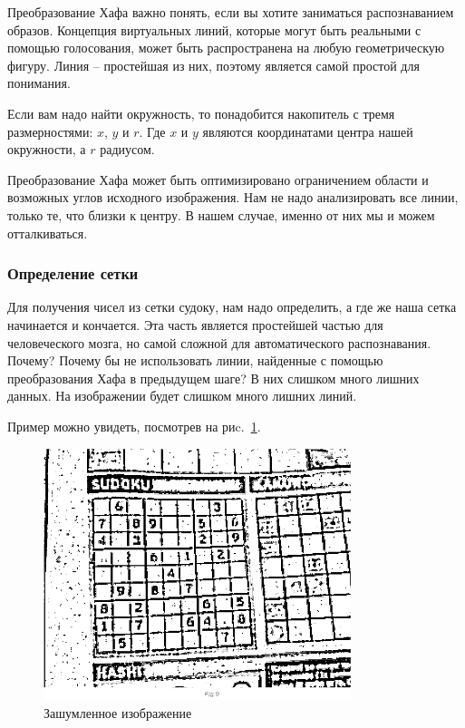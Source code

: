 Преобразование Хафа важно понять, если вы хотите заниматься распознаванием образов. Концепция виртуальных линий, которые могут быть реальными с помощью голосования, может быть распространена на любую геометрическую фигуру. Линия – простейшая из них, поэтому является самой простой для понимания. 

Если вам надо найти окружность, то понадобится накопитель с тремя размерностями: $x$, $y$ и $r$. Где $x$ и $y$ являются координатами центра нашей окружности, а $r$ радиусом.

Преобразование Хафа может быть оптимизировано ограничением области и возможных углов исходного изображения. Нам не надо анализировать все линии, только те, что близки к центру. В нашем случае, именно от них мы и можем отталкиваться.

\subsubsection{Определение сетки}

Для получения чисел из сетки судоку, нам надо определить, а где же наша сетка начинается и кончается. Эта часть является простейшей частью для человеческого мозга, но самой сложной для автоматического распознавания. Почему? Почему бы не использовать линии, найденные с помощью преобразования Хафа в предыдущем шаге? В них слишком много лишних данных. На изображении будет слишком много лишних линий. 

Пример можно увидеть, посмотрев на риc.~\ref{fig:fig28}.
\begin{figure}[ht!]
  \centering
  \includegraphics[width=0.8\textwidth]{inc/raster/design2-8.png}
  \caption{Зашумленное изображение}
  \label{fig:fig28}
\end{figure}

